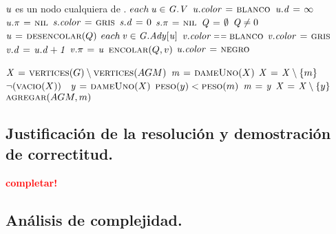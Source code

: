 \begin{codebox}
\li \Comment $\id{u}$ es un nodo cualquiera de .
\li \For $each \hspace{0.07cm} \id{u} \in \id{G.V}$
\li     \Do
            $\id{u.color} \gets \const{blanco}$
\li         $\id{u.d} \gets \infty$
\li         $\id{u.\pi} \gets \const{nil}$
        \End
\li $\id{s.color} \gets \const{gris}$
\li $\id{s.d} \gets 0$
\li $\id{s.\pi} \gets \const{nil}$
\li $\id{Q} \gets \emptyset$
\li \While $\id{Q} \neq 0$
\li     \Do
            $\id{u} \gets \proc{desencolar}(Q)$
\li         \For $each \hspace{0.07cm} \id{v} \in \id{G.Ady[u]}$
                \Do
\li                 \If $\id{v.color} \isequal \const{blanco}$
\li                     \Then
                            $\id{v.color} \gets \const{gris}$
\li                         $\id{v.d} \gets \id{u.d + 1}$
\li                         $\id{v.\pi} \gets \id{u}$
\li                         $\textnormal{\scshape encolar}(Q,v)$
                        \End
                \End
\li     $\id{u.color} \gets \const{negro}$
        \End
\end{codebox}


\vspace*{0.3cm}


\begin{codebox}
\li $\id{X} \gets \proc{vertices}(G) \setminus \proc{vertices}(AGM)$
\li $\id{m} \gets \proc{dameUno}(X)$
\li $\id{X} \gets \id{X} \setminus \{m\}$
\li \While $\neg (\textnormal{\scshape vacio}(X))$
\li     \Do
\           $\id{y} \gets \proc{dameUno}(X)$
\li         \If $\textnormal{\scshape peso}(y) < \textnormal{\scshape peso}(m)$
\li             \Then
                    $\id{m} \gets \id{y}$
                \End
\li         $\id{X} \gets \id{X} \setminus \{y\}$
        \End
\li \Return $\textnormal{\scshape agregar}(AGM, m)$
\end{codebox}



\newpage
\subsection{Justificación de la resolución y demostración de correctitud.}

\vspace*{0.3cm}

\textcolor{red}{\textbf{completar!}}



\newpage
\subsection{Análisis de complejidad.}


